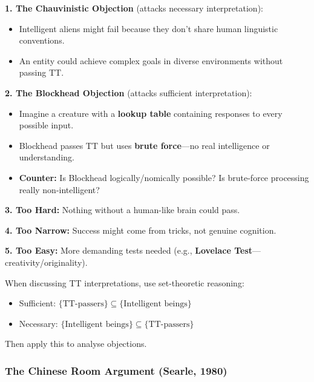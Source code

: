 \begin{exbox}
\textbf{1. The Chauvinistic Objection} (attacks necessary interpretation):
\begin{itemize}
  \item Intelligent aliens might fail because they don't share human linguistic conventions.
  \item An entity could achieve complex goals in diverse environments without passing TT.
\end{itemize}

\textbf{2. The Blockhead Objection} (attacks sufficient interpretation):
\begin{itemize}
  \item Imagine a creature with a \textbf{lookup table} containing responses to every possible input.
  \item Blockhead passes TT but uses \textbf{brute force}---no real intelligence or understanding.
  \item \textbf{Counter:} Is Blockhead logically/nomically possible? Is brute-force processing really non-intelligent?
\end{itemize}

\textbf{3. Too Hard:} Nothing without a human-like brain could pass.

\textbf{4. Too Narrow:} Success might come from tricks, not genuine cognition.

\textbf{5. Too Easy:} More demanding tests needed (e.g., \textbf{Lovelace Test}---creativity/originality).
\end{exbox}

\begin{tipbox}
When discussing TT interpretations, use set-theoretic reasoning:
\begin{itemize}
  \item Sufficient: $\{\text{TT-passers}\} \subseteq \{\text{Intelligent beings}\}$
  \item Necessary: $\{\text{Intelligent beings}\} \subseteq \{\text{TT-passers}\}$
\end{itemize}
Then apply this to analyse objections.
\end{tipbox}

\bigseparator

\subsubsection{The Chinese Room Argument (Searle, 1980)}

